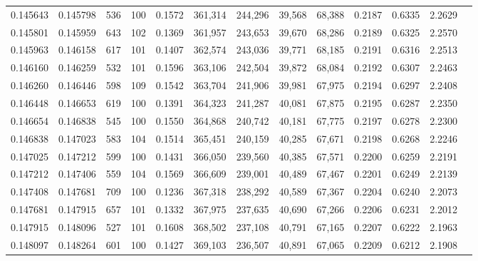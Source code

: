 \begin{tabular}{rrrrrrrrrrrrr}
0.145643 & 0.145798 &   536 & 100 &                                     0.1572 & 361,314 & 244,296 &  39,568 &  68,388 & 0.2187 & 0.6335 & 2.2629 \\
0.145801 & 0.145959 &   643 & 102 &                                     0.1369 & 361,957 & 243,653 &  39,670 &  68,286 & 0.2189 & 0.6325 & 2.2570 \\
0.145963 & 0.146158 &   617 & 101 &                                     0.1407 & 362,574 & 243,036 &  39,771 &  68,185 & 0.2191 & 0.6316 & 2.2513 \\
0.146160 & 0.146259 &   532 & 101 &                                     0.1596 & 363,106 & 242,504 &  39,872 &  68,084 & 0.2192 & 0.6307 & 2.2463 \\
0.146260 & 0.146446 &   598 & 109 &                                     0.1542 & 363,704 & 241,906 &  39,981 &  67,975 & 0.2194 & 0.6297 & 2.2408 \\
0.146448 & 0.146653 &   619 & 100 &                                     0.1391 & 364,323 & 241,287 &  40,081 &  67,875 & 0.2195 & 0.6287 & 2.2350 \\
0.146654 & 0.146838 &   545 & 100 &                                     0.1550 & 364,868 & 240,742 &  40,181 &  67,775 & 0.2197 & 0.6278 & 2.2300 \\
0.146838 & 0.147023 &   583 & 104 &                                     0.1514 & 365,451 & 240,159 &  40,285 &  67,671 & 0.2198 & 0.6268 & 2.2246 \\
0.147025 & 0.147212 &   599 & 100 &                                     0.1431 & 366,050 & 239,560 &  40,385 &  67,571 & 0.2200 & 0.6259 & 2.2191 \\
0.147212 & 0.147406 &   559 & 104 &                                     0.1569 & 366,609 & 239,001 &  40,489 &  67,467 & 0.2201 & 0.6249 & 2.2139 \\
0.147408 & 0.147681 &   709 & 100 &                                     0.1236 & 367,318 & 238,292 &  40,589 &  67,367 & 0.2204 & 0.6240 & 2.2073 \\
0.147681 & 0.147915 &   657 & 101 &                                     0.1332 & 367,975 & 237,635 &  40,690 &  67,266 & 0.2206 & 0.6231 & 2.2012 \\
0.147915 & 0.148096 &   527 & 101 &                                     0.1608 & 368,502 & 237,108 &  40,791 &  67,165 & 0.2207 & 0.6222 & 2.1963 \\
0.148097 & 0.148264 &   601 & 100 &                                     0.1427 & 369,103 & 236,507 &  40,891 &  67,065 & 0.2209 & 0.6212 & 2.1908 \\

\end{tabular}
